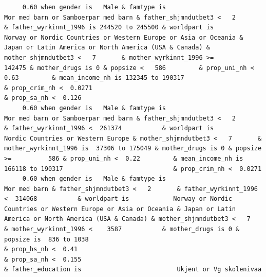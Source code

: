 \documentclass[
  letterpaper,
  DIV=11,
  numbers=noendperiod]{scrreprt}
\begin{document}
\begin{verbatim}
     0.60 when gender is   Male & famtype is                              Mor med barn or Samboerpar med barn & father_shjmndutbet3 <   2       & father_wyrkinnt_1996 is 244520 to 245500 & worldpart is            Norway or Nordic Countries or Western Europe or Asia or Oceania & Japan or Latin America or North America (USA & Canada) & mother_shjmndutbet3 <   7       & mother_wyrkinnt_1996 >=           142475 & mother_drugs is 0 & popsize <   586         & prop_uni_nh <  0.63         & mean_income_nh is 132345 to 190317                              & prop_crim_nh <  0.0271                                                                                                                  & prop_sa_nh <  0.126                                                                                                                                               
     0.60 when gender is   Male & famtype is                              Mor med barn or Samboerpar med barn & father_shjmndutbet3 <   2       & father_wyrkinnt_1996 <  261374           & worldpart is                                                                                                  Nordic Countries or Western Europe & mother_shjmndutbet3 <   7       & mother_wyrkinnt_1996 is  37306 to 175049 & mother_drugs is 0 & popsize >=          586 & prop_uni_nh <  0.22         & mean_income_nh is 166118 to 190317                              & prop_crim_nh <  0.0271                                                                                                                                                                                                                                                                                      
     0.60 when gender is   Male & famtype is                                                     Mor med barn & father_shjmndutbet3 <   2       & father_wyrkinnt_1996 <  314068           & worldpart is            Norway or Nordic Countries or Western Europe or Asia or Oceania & Japan or Latin America or North America (USA & Canada) & mother_shjmndutbet3 <   7       & mother_wyrkinnt_1996 <    3587           & mother_drugs is 0 & popsize is  836 to 1038                                                                    & prop_hs_nh <  0.41                                                                                                                                                   & prop_sa_nh <  0.155                                                     & father_education is                          Ukjent or Vg skolenivaa                    

\end{verbatim}
\end{document}
